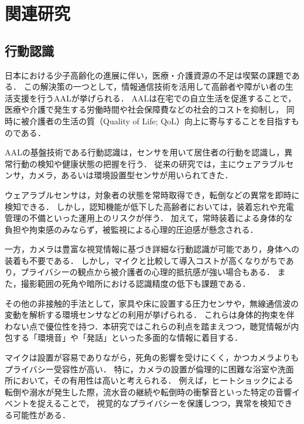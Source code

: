 \documentclass[main]{subfiles}
\begin{document}
\section{関連研究}
\subsection{行動認識}
日本における少子高齢化の進展に伴い，医療・介護資源の不足は喫緊の課題である．
この解決策の一つとして，情報通信技術を活用して高齢者や障がい者の生活支援を行うAALが挙げられる．
AALは在宅での自立生活を促進することで，医療や介護で発生する労働時間や社会保障費などの社会的コストを抑制し，
同時に被介護者の生活の質（Quality of Life; QoL）向上に寄与することを目指すものである\cite{blackman2016ambient}．\par

AALの基盤技術である行動認識は，センサを用いて居住者の行動を認識し，異常行動の検知や健康状態の把握を行う．
従来の研究では，主にウェアラブルセンサ，カメラ，あるいは環境設置型センサが用いられてきた．\par

ウェアラブルセンサは，対象者の状態を常時取得でき，転倒などの異常を即時に検知できる．
しかし，認知機能が低下した高齢者においては，装着忘れや充電管理の不備といった運用上のリスクが伴う．
加えて，常時装着による身体的な負担や拘束感のみならず，被監視による心理的圧迫感が懸念される\cite{guerra2023ambient}． \par

一方，カメラは豊富な視覚情報に基づき詳細な行動認識が可能であり，身体への装着も不要である．
しかし，マイクと比較して導入コストが高くなりがちであり，プライバシーの観点から被介護者の心理的抵抗感が強い場合もある．
また，撮影範囲の死角や暗所における認識精度の低下も課題である\cite{guerra2023ambient,bouchabou2021survey}．\par

その他の非接触的手法として，家具や床に設置する圧力センサや，無線通信波の変動を解析する環境センサなどの利用が挙げられる\cite{guerra2023ambient}．
これらは身体的拘束を伴わない点で優位性を持つ．本研究ではこれらの利点を踏まえつつ，聴覚情報が内包する「環境音」や「発話」といった多面的な情報に着目する．\par

マイクは設置が容易でありながら，死角の影響を受けにくく，かつカメラよりもプライバシー受容性が高い．
特に，カメラの設置が倫理的に困難な浴室や洗面所において，その有用性は高いと考えられる\cite{hyun2023sound}．
例えば，ヒートショックによる転倒や溺水が発生した際，流水音の継続や転倒時の衝撃音といった特定の音響イベントを捉えることで，
視覚的なプライバシーを保護しつつ，異常を検知できる可能性がある．\par
\end{document}
